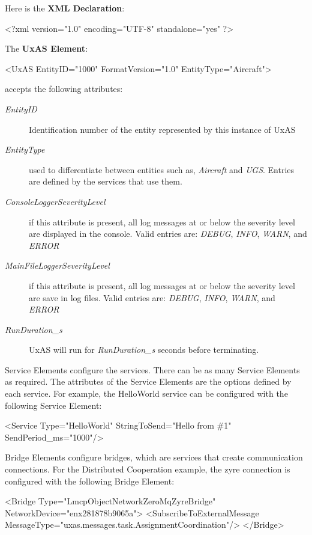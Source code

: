Here is the \textbf{XML Declaration}:
\begin{docspec}<?xml version="1.0" encoding="UTF-8" standalone="yes" ?>\end{docspec}
The \textbf{UxAS Element}:
\begin{docspec}
	<UxAS EntityID="1000" FormatVersion="1.0" EntityType="Aircraft">
\end{docspec}
accepts the following attributes:
\begin{description}
	\item[\textit{EntityID}] Identification number of the entity represented by this instance of UxAS
	\item[\textit{EntityType}] used to differentiate between entities such as, \textit{Aircraft} and \textit{UGS}. Entries are defined by the services that use them.
	\item[\textit{ConsoleLoggerSeverityLevel}] if this attribute is present, all log messages at or below the severity level are displayed in the console. Valid entries are: \textit{DEBUG}, \textit{INFO}, \textit{WARN}, and \textit{ERROR}
	\item[\textit{MainFileLoggerSeverityLevel}] if this attribute is present, all log messages at or below the severity level are save in log files. Valid entries are: \textit{DEBUG}, \textit{INFO}, \textit{WARN}, and \textit{ERROR}
	\item[\textit{RunDuration\_s}] UxAS will run for \textit{RunDuration\_s} seconds before terminating.
\end{description}
Service Elements configure the services. There can be as many Service Elements as required. The attributes of the Service Elements are the options defined by each service. For example, the HelloWorld service can be configured with the following Service Element:
\begin{docspec}
	<Service Type="HelloWorld" StringToSend="Hello from \#1" SendPeriod\_ms="1000"/>
\end{docspec}
Bridge Elements configure bridges, which are services that create communication connections. For the Distributed Cooperation example, the zyre connection is configured with the following Bridge Element:
\begin{docspec}
    <Bridge Type="LmcpObjectNetworkZeroMqZyreBridge" NetworkDevice="enx281878b9065a">
	\quad<SubscribeToExternalMessage MessageType="uxas.messages.task.AssignmentCoordination"/>
	</Bridge>
\end{docspec}



